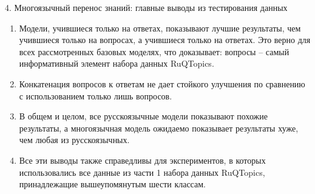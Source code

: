 \begin{frame}{4. Многоязычный перенос знаний: главные выводы из тестирования данных}
\begin{enumerate}
\item Модели, учившиеся только на ответах, показывают лучшие результаты, чем учившиеся только на вопросах, а учившиеся только на ответах. Это верно для всех рассмотренных базовых моделях, что доказывает: вопросы -- самый информативный элемент набора данных {RuQTopics}. 

\item Конкатенация вопросов к ответам не дает стойкого улучшения по сравнению с использованием только лишь вопросов. 

\item В общем и целом, все русскоязычные модели показывают похожие результаты, а многоязычная модель ожидаемо показывает результаты хуже, чем любая из русскоязычных. 

\item Все эти выводы также справедливы для экспериментов, в которых использовались все данные из части 1 набора данных {RuQTopics}, принадлежащие вышеупомянутым шести классам.
\end{enumerate}
\end{frame}


